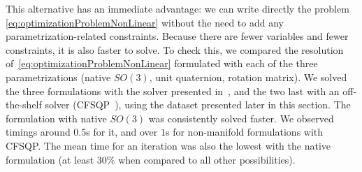 This alternative has an immediate advantage: we can write directly the problem \eqref{eq:optimizationProblemNonLinear} without the need to add any parametrization-related constraints. Because there are fewer variables and fewer constraints, it is also faster to solve. To check this, we compared the resolution of~\eqref{eq:optimizationProblemNonLinear} formulated with each of the three parametrizations (native $SO(3)$, unit quaternion, rotation matrix). We solved the three formulations with the solver presented in~\citep{brossette2015humanoid}, and the two last with an off-the-shelf solver (CFSQP~\citep{cfsqp:manual}), using the dataset presented later in this section. 
The formulation with native $SO(3)$ was consistently solved faster. We observed timings around $0.5$s for it, and over $1$s for non-manifold formulations with CFSQP. The mean time for an iteration was also the lowest with the native formulation (at least $30\%$ when compared to all other possibilities).




